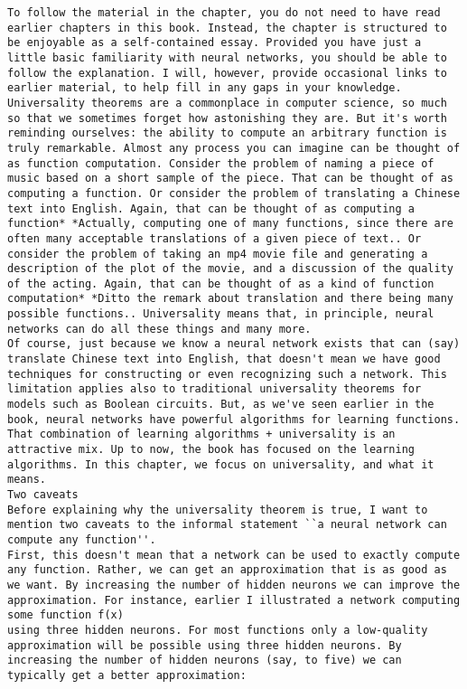 \begin{lstlisting}
To follow the material in the chapter, you do not need to have read earlier chapters in this book. Instead, the chapter is structured to be enjoyable as a self-contained essay. Provided you have just a little basic familiarity with neural networks, you should be able to follow the explanation. I will, however, provide occasional links to earlier material, to help fill in any gaps in your knowledge.
Universality theorems are a commonplace in computer science, so much so that we sometimes forget how astonishing they are. But it's worth reminding ourselves: the ability to compute an arbitrary function is truly remarkable. Almost any process you can imagine can be thought of as function computation. Consider the problem of naming a piece of music based on a short sample of the piece. That can be thought of as computing a function. Or consider the problem of translating a Chinese text into English. Again, that can be thought of as computing a function* *Actually, computing one of many functions, since there are often many acceptable translations of a given piece of text.. Or consider the problem of taking an mp4 movie file and generating a description of the plot of the movie, and a discussion of the quality of the acting. Again, that can be thought of as a kind of function computation* *Ditto the remark about translation and there being many possible functions.. Universality means that, in principle, neural networks can do all these things and many more.
Of course, just because we know a neural network exists that can (say) translate Chinese text into English, that doesn't mean we have good techniques for constructing or even recognizing such a network. This limitation applies also to traditional universality theorems for models such as Boolean circuits. But, as we've seen earlier in the book, neural networks have powerful algorithms for learning functions. That combination of learning algorithms + universality is an attractive mix. Up to now, the book has focused on the learning algorithms. In this chapter, we focus on universality, and what it means.
Two caveats
Before explaining why the universality theorem is true, I want to mention two caveats to the informal statement ``a neural network can compute any function''.
First, this doesn't mean that a network can be used to exactly compute any function. Rather, we can get an approximation that is as good as we want. By increasing the number of hidden neurons we can improve the approximation. For instance, earlier I illustrated a network computing some function f(x)
using three hidden neurons. For most functions only a low-quality approximation will be possible using three hidden neurons. By increasing the number of hidden neurons (say, to five) we can typically get a better approximation:

\end{lstlisting}
